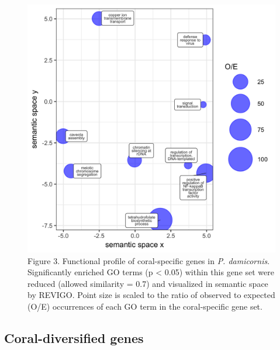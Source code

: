 \documentclass[]{elsarticle} %
\makeatletter
\def\maxwidth{\ifdim\Gin@nat@width>\linewidth\linewidth
\else\Gin@nat@width\fi}
\let\Oldincludegraphics\includegraphics
\renewcommand{\includegraphics}[1]{\Oldincludegraphics[width=\maxwidth]{#1}}
\makeatother
\begin{document}
\begin{figure}
\centering
\includegraphics{../coral_specific/coral_specific_enriched_revigo.png}
\caption{Figure 3. Functional profile of coral-specific genes in
\emph{P. damicornis}. Significantly enriched GO terms (p \textless{}
0.05) within this gene set were reduced (allowed similarity = 0.7) and
visualized in semantic space by REVIGO. Point size is scaled to the
ratio of observed to expected (O/E) occurrences of each GO term in the
coral-specific gene set.}
\end{figure}

\subsection{Coral-diversified genes}\label{coral-diversified-genes}
\end{document}
